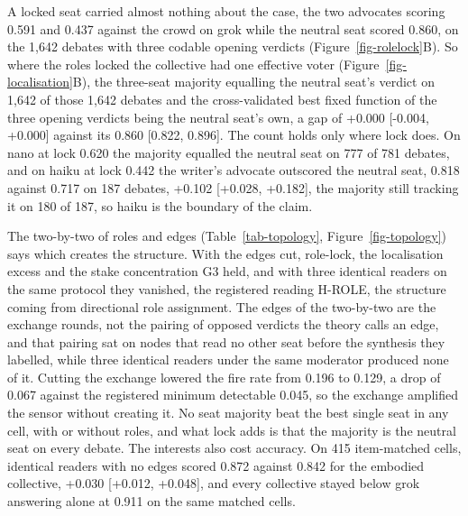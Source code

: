 A locked seat carried almost nothing about the case, the two advocates
scoring 0.591 and 0.437 against the crowd on grok while the neutral seat
scored 0.860, on the 1,642 debates with three codable opening verdicts
(Figure~\ref{fig-rolelock}B).
So where the roles locked the collective had one effective voter
(Figure~\ref{fig-localisation}B), the three-seat majority equalling the
neutral seat's verdict on 1,642 of those 1,642 debates and the
cross-validated best fixed function of the three opening verdicts being
the neutral seat's own, a gap of +0.000 [-0.004, +0.000] against its
0.860 [0.822, 0.896].
The count holds only where lock does. On nano at lock 0.620 the majority
equalled the neutral seat on 777 of 781 debates, and on haiku at lock 0.442
the writer's advocate outscored the neutral seat, 0.818 against 0.717 on
187 debates, +0.102 [+0.028, +0.182], the majority still tracking it on
180 of 187, so haiku is the boundary of the claim.

The two-by-two of roles and edges (Table~\ref{tab-topology}, Figure~\ref{fig-topology}) says which
creates the structure. With the edges cut, role-lock, the localisation
excess and the stake concentration G3 held, and with three identical
readers on the same protocol they vanished, the registered reading H-ROLE,
the structure coming from directional role assignment.
The edges of the two-by-two are the exchange rounds, not the pairing of
opposed verdicts the theory calls an edge, and that pairing sat on nodes
that read no other seat before the synthesis they labelled, while three
identical readers under the same moderator produced none of it.
Cutting the exchange lowered the fire rate from 0.196 to 0.129, a drop of
0.067 against the registered minimum detectable 0.045, so the exchange
amplified the sensor without creating it.
No seat majority beat the best single seat in any cell, with or without
roles, and what lock adds is that the majority is the neutral seat on every
debate.
The interests also cost accuracy. On 415 item-matched cells, identical
readers with no edges scored 0.872 against 0.842 for the embodied
collective, +0.030 [+0.012, +0.048], and every collective stayed below
grok answering alone at 0.911 on the same matched cells.

